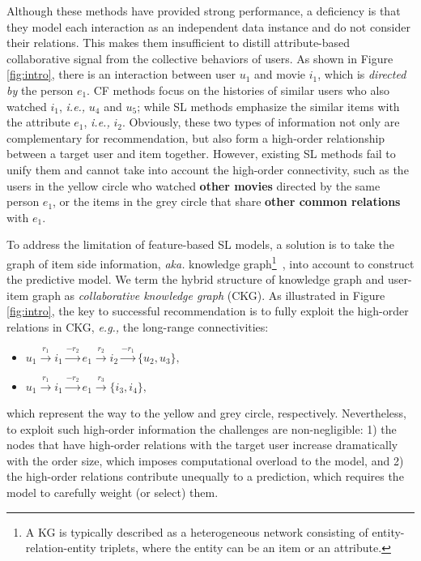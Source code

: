 \documentclass[sigconf]{acmart}
\newcommand{\ie}{\emph{i.e., }}
\newcommand{\eg}{\emph{e.g., }}
\newcommand{\aka}{\emph{aka. }}
\theoremstyle{definition}
\begin{document}
Although these methods have provided strong performance, a deficiency is that they model each interaction as an independent data instance and do not consider their relations. 
This makes them insufficient to distill attribute-based collaborative signal from the collective behaviors of users.
As shown in Figure \ref{fig:intro}, there is an interaction between user $u_1$ and movie $i_1$, which is \textit{directed by} the person $e_1$. CF methods focus on the histories of similar users who also watched $i_1$, \ie $u_4$ and $u_5$; while SL methods emphasize the similar items with the attribute $e_1$, \ie $i_2$. Obviously, these two types of information not only are complementary for recommendation, but also form a high-order relationship between a target user and item together. However, existing SL methods fail to unify them and cannot take into account the high-order connectivity, such as the users in the yellow circle who watched \textbf{other movies} directed by the same person $e_1$, or the items in the grey circle that share \textbf{other common relations} with $e_1$.


To address the limitation of feature-based SL models, a solution is to take the graph of item side information, \aka knowledge graph\footnote{A KG is typically described as a heterogeneous network consisting of entity-relation-entity triplets, where the entity can be an item or an attribute.}~\cite{cao2018joint,cao2018neural}, into account to construct the predictive model. We term the hybrid structure of knowledge graph and user-item graph as \textit{collaborative knowledge graph} (CKG).
As illustrated in Figure \ref{fig:intro}, the key to successful recommendation is to fully exploit the high-order relations in CKG, \eg the long-range connectivities:
\begin{itemize}[leftmargin=*]
    \item $u_1\xrightarrow{r_1}i_1\xrightarrow{-r_2} e_1 \xrightarrow{r_2} i_2 \xrightarrow{-r_1} \{u_2, u_3\},$
    \item $u_1\xrightarrow{r_1}i_1\xrightarrow{-r_2} e_1 \xrightarrow{r_3}\{i_3, i_4\},$
\end{itemize}
which represent the way to the yellow and grey circle, respectively.
Nevertheless, to exploit such high-order information the challenges are non-negligible: 1) the nodes that have high-order relations with the target user increase dramatically with the order size, which imposes computational overload to the model, and 2) the high-order relations contribute unequally to a prediction, which requires the model to carefully weight (or select) them. 
\end{document}

